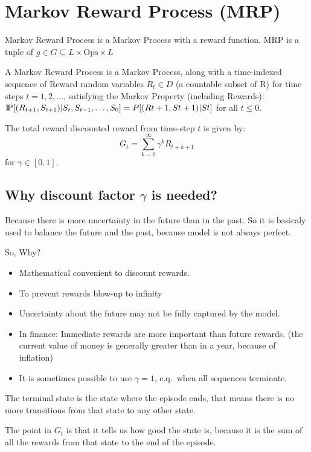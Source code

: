 \section{Markov Reward Process (MRP)}\label{sec:markov-reward-process}
Markov Reward Process is a Markov Process with a reward function.
MRP is a tuple of $g\in G\subseteq L \times \mathrm{Ops} \times L$
\begin{definition}
    A Markov Reward Process is a Markov Process, along with a time-indexed
    sequence of Reward random variables $R_t \in D$ (a countable subset of R) for time steps $t =
    1,2,\ldots$, satisfying the Markov Property (including Rewards):
    $\text{I\kern-0.15em P}[(R_{t+1}, S_{t+1})|S_t, S_{t-1}, \ldots, S_0] = P[(Rt+1, St+1)|St]$ for all $t \leq 0.$~\cite[p.~79]{rao-2022}
\end{definition}

The total reward discounted reward from time-step $t$ is given by:
\[
    G_t = \sum_{k=0}^{\infty} \gamma^k R_{t+k+1}
\]
for $\gamma \in [0,1]$.

\subsection{Why discount factor $\gamma$ is needed?}
Because there is more uncertainty in the future than in the past.
So it is basicaly used to balance the future and the past, because
model is not always perfect.

So, Why?
\begin{itemize}
    \item Mathematical convenient to discount rewards.
    \item To prevent rewards blow-up to infinity
    \item Uncertainty about the future may not be fully captured by the model.
    \item In finance: Immediate rewards are more important than future rewards.
    (the current value of money is generally greater than in a year, because of inflation)
    \item It is sometimes possible to use $\gamma=1$, e.q.\ when all sequences terminate.
\end{itemize}

The terminal state is the state where the episode ends, that means there
is no more transitions from that state to any other state.

The point in $G_t$ is that it tells us how good the state is, because
it is the sum of all the rewards from that state to the end of the episode. %


